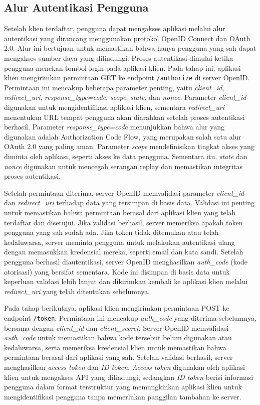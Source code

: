 \subsection{Alur Autentikasi Pengguna}
Setelah klien terdaftar, pengguna dapat mengakses aplikasi melalui alur autentikasi yang dirancang menggunakan protokol OpenID Connect dan OAuth 2.0. Alur ini bertujuan untuk memastikan bahwa hanya pengguna yang sah dapat mengakses sumber daya yang dilindungi. Proses autentikasi dimulai ketika pengguna menekan tombol login pada aplikasi klien. Pada tahap ini, aplikasi klien mengirimkan permintaan GET ke endpoint \texttt{/authorize} di server OpenID. Permintaan ini mencakup beberapa parameter penting, yaitu \emph{client\_id}, \emph{redirect\_uri}, \emph{response\_type=code}, \emph{scope}, \emph{state}, dan \emph{nonce}. Parameter \emph{client\_id} digunakan untuk mengidentifikasi aplikasi klien, sementara \emph{redirect\_uri} menentukan URL tempat pengguna akan diarahkan setelah proses autentikasi berhasil. Parameter \emph{response\_type=code} menunjukkan bahwa alur yang digunakan adalah Authorization Code Flow, yang merupakan salah satu alur OAuth 2.0 yang paling aman. Parameter \emph{scope} mendefinisikan tingkat akses yang diminta oleh aplikasi, seperti akses ke data pengguna. Sementara itu, \emph{state} dan \emph{nonce} digunakan untuk mencegah serangan replay dan memastikan integritas proses autentikasi.

Setelah permintaan diterima, server OpenID memvalidasi parameter \emph{client\_id} dan \emph{redirect\_uri} terhadap data yang tersimpan di basis data. Validasi ini penting untuk memastikan bahwa permintaan berasal dari aplikasi klien yang telah terdaftar dan disetujui. Jika validasi berhasil, server memeriksa apakah token pengguna yang sah sudah ada. Jika token tidak ditemukan atau telah kedaluwarsa, server meminta pengguna untuk melakukan autentikasi ulang dengan memasukkan kredensial mereka, seperti email dan kata sandi. Setelah pengguna berhasil diautentikasi, server OpenID menghasilkan \emph{auth\_code} (kode otorisasi) yang bersifat sementara. Kode ini disimpan di basis data untuk keperluan validasi lebih lanjut dan dikirimkan kembali ke aplikasi klien melalui \emph{redirect\_uri} yang telah ditentukan sebelumnya.

Pada tahap berikutnya, aplikasi klien mengirimkan permintaan POST ke endpoint \texttt{/token}. Permintaan ini mencakup \emph{auth\_code} yang diterima sebelumnya, bersama dengan \emph{client\_id} dan \emph{client\_secret}. Server OpenID memvalidasi \emph{auth\_code} untuk memastikan bahwa kode tersebut belum digunakan atau kedaluwarsa, serta memeriksa kredensial klien untuk memastikan bahwa permintaan berasal dari aplikasi yang sah. Setelah validasi berhasil, server menghasilkan \emph{access token} dan \emph{ID token}. \emph{Access token} digunakan oleh aplikasi klien untuk mengakses API yang dilindungi, sedangkan \emph{ID token} berisi informasi pengguna dalam format terstruktur yang memungkinkan aplikasi klien untuk mengidentifikasi pengguna tanpa memerlukan panggilan tambahan ke server.

